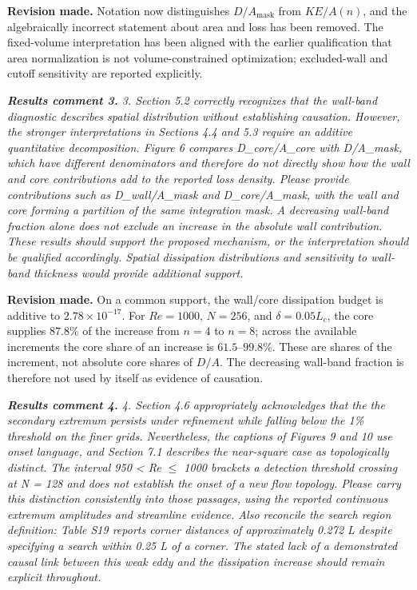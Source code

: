 \documentclass[11pt,a4paper]{article}
\newcommand{\qcomment}[1]{\textcolor{deepblue}{\itshape #1}}
\newcommand{\revwork}[1]{\textbf{\textcolor{revgreen}{#1}}}
\begin{document}
\noindent\revwork{Revision made.} Notation now distinguishes $D/A_{\mathrm{mask}}$ from $KE/A(n)$, and the algebraically incorrect statement about area and loss has been removed. The fixed-volume interpretation has been aligned with the earlier qualification that area normalization is not volume-constrained optimization; excluded-wall and cutoff sensitivity are reported explicitly.

\medskip
\noindent\qcomment{\textbf{Results comment 3.} 3. Section 5.2 correctly recognizes that the wall-band diagnostic describes spatial distribution without establishing causation. However, the stronger interpretations in Sections 4.4 and 5.3 require an additive quantitative decomposition. Figure 6 compares D\_core/A\_core with D/A\_mask, which have different denominators and therefore do not directly show how the wall and core contributions add to the reported loss density. Please provide contributions such as D\_wall/A\_mask and D\_core/A\_mask, with the wall and core forming a partition of the same integration mask. A decreasing wall-band fraction alone does not exclude an increase in the absolute wall contribution. These results should support the proposed mechanism, or the interpretation should be qualified accordingly. Spatial dissipation distributions and sensitivity to wall-band thickness would provide additional support.}

\noindent\revwork{Revision made.} On a common support, the wall/core dissipation budget is additive to $2.78\times10^{-17}$. For $Re=1000$, $N=256$, and $\delta=0.05L_c$, the core supplies $87.8\%$ of the increase from $n=4$ to $n=8$; across the available increments the core share of an increase is $61.5$--$99.8\%$. These are shares of the increment, not absolute core shares of $D/A$. The decreasing wall-band fraction is therefore not used by itself as evidence of causation.

\medskip
\noindent\qcomment{\textbf{Results comment 4.} 4. Section 4.6 appropriately acknowledges that the the secondary extremum persists under refinement while falling below the 1\% threshold on the finer grids. Nevertheless, the captions of Figures 9 and 10 use onset language, and Section 7.1 describes the near-square case as topologically distinct. The interval 950 < Re $\le$ 1000 brackets a detection threshold crossing at N = 128 and does not establish the onset of a new flow topology. Please carry this distinction consistently into those passages, using the reported continuous extremum amplitudes and streamline evidence. Also reconcile the search region definition: Table S19 reports corner distances of approximately 0.272 L despite specifying a search within 0.25 L of a corner. The stated lack of a demonstrated causal link between this weak eddy and the dissipation increase should remain explicit throughout.}
\end{document}
